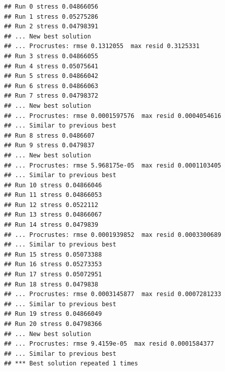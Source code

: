 \documentclass[
]{article}
\newenvironment{Shaded}{\begin{snugshade}}{\end{snugshade}}
\newcommand{\AttributeTok}[1]{\textcolor[rgb]{0.13,0.29,0.53}{#1}}
\newcommand{\CommentTok}[1]{\textcolor[rgb]{0.56,0.35,0.01}{\textit{#1}}}
\newcommand{\DecValTok}[1]{\textcolor[rgb]{0.00,0.00,0.81}{#1}}
\newcommand{\FunctionTok}[1]{\textcolor[rgb]{0.13,0.29,0.53}{\textbf{#1}}}
\newcommand{\NormalTok}[1]{#1}
\newcommand{\OtherTok}[1]{\textcolor[rgb]{0.56,0.35,0.01}{#1}}
\newcommand{\SpecialCharTok}[1]{\textcolor[rgb]{0.81,0.36,0.00}{\textbf{#1}}}
\newcommand{\StringTok}[1]{\textcolor[rgb]{0.31,0.60,0.02}{#1}}
\begin{document}
\begin{Shaded}
\end{Shaded}

\begin{verbatim}
## Run 0 stress 0.04866056 
## Run 1 stress 0.05275286 
## Run 2 stress 0.04798391 
## ... New best solution
## ... Procrustes: rmse 0.1312055  max resid 0.3125331 
## Run 3 stress 0.04866055 
## Run 4 stress 0.05075641 
## Run 5 stress 0.04866042 
## Run 6 stress 0.04866063 
## Run 7 stress 0.04798372 
## ... New best solution
## ... Procrustes: rmse 0.0001597576  max resid 0.0004054616 
## ... Similar to previous best
## Run 8 stress 0.0486607 
## Run 9 stress 0.0479837 
## ... New best solution
## ... Procrustes: rmse 5.968175e-05  max resid 0.0001103405 
## ... Similar to previous best
## Run 10 stress 0.04866046 
## Run 11 stress 0.04866053 
## Run 12 stress 0.0522112 
## Run 13 stress 0.04866067 
## Run 14 stress 0.0479839 
## ... Procrustes: rmse 0.0001939852  max resid 0.0003300689 
## ... Similar to previous best
## Run 15 stress 0.05073388 
## Run 16 stress 0.05273353 
## Run 17 stress 0.05072951 
## Run 18 stress 0.0479838 
## ... Procrustes: rmse 0.0003145877  max resid 0.0007281233 
## ... Similar to previous best
## Run 19 stress 0.04866049 
## Run 20 stress 0.04798366 
## ... New best solution
## ... Procrustes: rmse 9.4159e-05  max resid 0.0001584377 
## ... Similar to previous best
## *** Best solution repeated 1 times
\end{verbatim}
\end{document}
